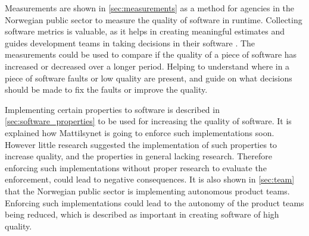 
\newpage

Measurements are shown in \autoref{sec:measurements} as a method for agencies in the Norwegian public sector to measure the quality of software in runtime. Collecting software metrics is valuable, as it helps in creating meaningful estimates and guides development teams in taking decisions in their software \cite{jkc_2010}. The measurements could be used to compare if the quality of a piece of software has increased or decreased over a longer period. Helping to understand where in a piece of software faults or low quality are present, and guide on what decisions should be made to fix the faults or improve the quality.


Implementing certain properties to software is described in \autoref{sec:software_properties} to be used for increasing the quality of software. It is explained how Mattilsynet is going to enforce such implementations soon. However little research suggested the implementation of such properties to increase quality, and the properties in general lacking research. Therefore enforcing such implementations without proper research to evaluate the enforcement, could lead to negative consequences. It is also shown in \autoref{sec:team} that the Norwegian public sector is implementing autonomous product teams. Enforcing such implementations could lead to the autonomy of the product teams being reduced, which is described as important in creating software of high quality.

